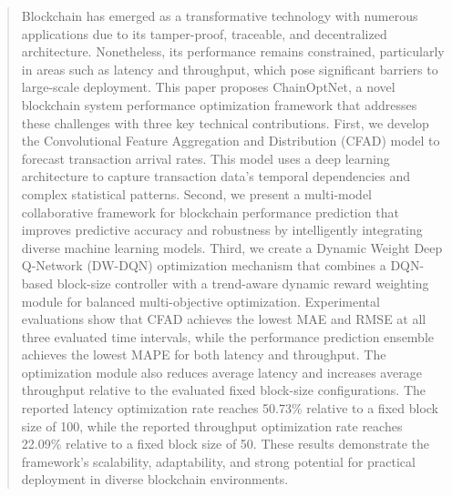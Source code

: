 \documentclass[a4paper,fleqn]{cas-dc}
\begin{document}
	
	
	\begin{abstract}
		Blockchain has emerged as a transformative technology with numerous applications due to its tamper-proof, traceable, and decentralized architecture. Nonetheless, its performance remains constrained, particularly in areas such as latency and throughput, which pose significant barriers to large-scale deployment. This paper proposes ChainOptNet, a novel blockchain system performance optimization framework that addresses these challenges with three key technical contributions. First, we develop the Convolutional Feature Aggregation and Distribution (CFAD) model to forecast transaction arrival rates. This model uses a deep learning architecture to capture transaction data's temporal dependencies and complex statistical patterns. Second, we present a multi-model collaborative framework for blockchain performance prediction that improves predictive accuracy and robustness by intelligently integrating diverse machine learning models. Third, we create a Dynamic Weight Deep Q-Network (DW-DQN) optimization mechanism that combines a DQN-based block-size controller with a trend-aware dynamic reward weighting module for balanced multi-objective optimization. 
		Experimental evaluations show that CFAD achieves the lowest MAE and RMSE at all three evaluated time intervals, while the performance prediction ensemble achieves the lowest MAPE for both latency and throughput. The optimization module also reduces average latency and increases average throughput relative to the evaluated fixed block-size configurations.
		The reported latency optimization rate reaches 50.73\% relative to a fixed block size of 100, while the reported throughput optimization rate reaches 22.09\% relative to a fixed block size of 50. These results demonstrate the framework’s scalability, adaptability, and strong potential for practical deployment in diverse blockchain environments.
	\end{abstract}
	
	
	
\end{document}
